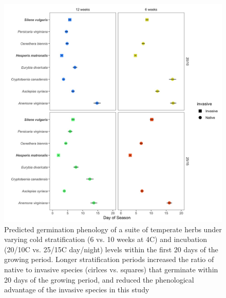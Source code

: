 \documentclass{article}\usepackage[]{graphicx}\usepackage[]{color}
\begin{document}
\begin{figure}[h!]
    \centering
\includegraphics[width=\textwidth]{..//figure/commchange.jpeg}
   \caption{Predicted germination phenology of a suite of temperate herbs under varying cold stratification (6 vs. 10 weeks at 4\degree C) and incubation (20/10\degree C  vs. 25/15\degree C day/night) levels within the first 20 days of the growing period. Longer stratification periods increased the ratio of native to invasive species (cirlces vs. squares) that germinate within 20 days of the growing period, and reduced the phenological advantage of the invasive species in this study } 
   \label{fig:comm}
\end{figure}



\end{document}
